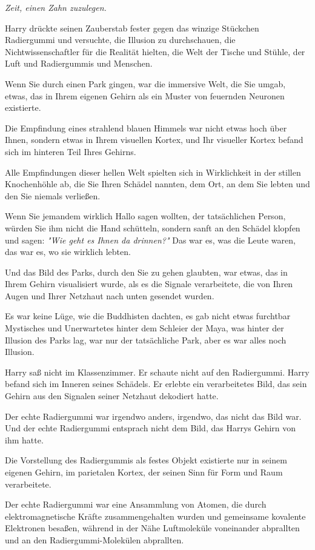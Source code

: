 {\emph{Zeit, einen Zahn zuzulegen.}

Harry drückte seinen Zauberstab fester gegen das winzige Stückchen Radiergummi und versuchte, die Illusion zu durchschauen, die Nichtwissenschaftler für die Realität hielten, die Welt der Tische und Stühle, der Luft und Radiergummis und Menschen.

Wenn Sie durch einen Park gingen, war die immersive Welt, die Sie umgab, etwas, das in Ihrem eigenen Gehirn als ein Muster von feuernden Neuronen existierte.

Die Empfindung eines strahlend blauen Himmels war nicht etwas hoch über Ihnen, sondern etwas in Ihrem visuellen Kortex, und Ihr visueller Kortex befand sich im hinteren Teil Ihres Gehirns.

Alle Empfindungen dieser hellen Welt spielten sich in Wirklichkeit in der stillen Knochenhöhle ab, die Sie Ihren Schädel nannten, dem Ort, an dem Sie lebten und den Sie niemals verließen.

Wenn Sie jemandem wirklich Hallo sagen wollten, der tatsächlichen Person, würden Sie ihm nicht die Hand schütteln, sondern sanft an den Schädel klopfen und sagen: \emph{"Wie geht es Ihnen da drinnen?"} Das war es, was die Leute waren, das war es, wo sie wirklich lebten.

Und das Bild des Parks, durch den Sie zu gehen glaubten, war etwas, das in Ihrem Gehirn visualisiert wurde, als es die Signale verarbeitete, die von Ihren Augen und Ihrer Netzhaut nach unten gesendet wurden.

Es war keine Lüge, wie die Buddhisten dachten, es gab nicht etwas furchtbar Mystisches und Unerwartetes hinter dem Schleier der Maya, was hinter der Illusion des Parks lag, war nur der tatsächliche Park, aber es war alles noch Illusion.

Harry saß nicht im Klassenzimmer. Er schaute nicht auf den Radiergummi. Harry befand sich im Inneren seines Schädels. Er erlebte ein verarbeitetes Bild, das sein Gehirn aus den Signalen seiner Netzhaut dekodiert hatte.

Der echte Radiergummi war irgendwo anders, irgendwo, das nicht das Bild war. Und der echte Radiergummi entsprach nicht dem Bild, das Harrys Gehirn von ihm hatte.

Die Vorstellung des Radiergummis als festes Objekt existierte nur in seinem eigenen Gehirn, im parietalen Kortex, der seinen Sinn für Form und Raum verarbeitete.

Der echte Radiergummi war eine Ansammlung von Atomen, die durch elektromagnetische Kräfte zusammengehalten wurden und gemeinsame kovalente Elektronen besaßen, während in der Nähe Luftmoleküle voneinander abprallten und an den Radiergummi-Molekülen abprallten.

}
